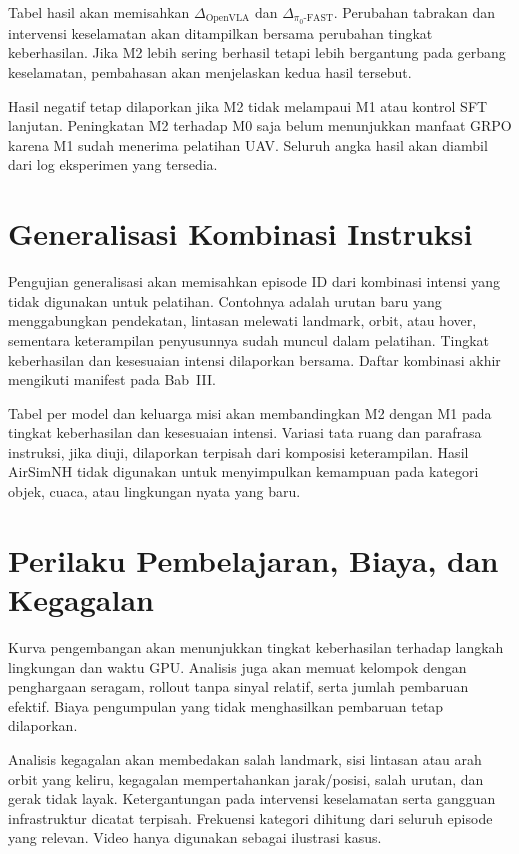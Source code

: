 Tabel hasil akan memisahkan $\Delta_{\mathrm{OpenVLA}}$ dan $\Delta_{\pi_0\text{-FAST}}$. Perubahan tabrakan dan intervensi keselamatan akan ditampilkan bersama perubahan tingkat keberhasilan. Jika M2 lebih sering berhasil tetapi lebih bergantung pada gerbang keselamatan, pembahasan akan menjelaskan kedua hasil tersebut.

Hasil negatif tetap dilaporkan jika M2 tidak melampaui M1 atau kontrol SFT lanjutan. Peningkatan M2 terhadap M0 saja belum menunjukkan manfaat GRPO karena M1 sudah menerima pelatihan UAV. Seluruh angka hasil akan diambil dari log eksperimen yang tersedia.

\section{Generalisasi Kombinasi Instruksi}
\label{sec:hasil_generalisasi}
Pengujian generalisasi akan memisahkan episode ID dari kombinasi intensi yang tidak digunakan untuk pelatihan. Contohnya adalah urutan baru yang menggabungkan pendekatan, lintasan melewati landmark, orbit, atau hover, sementara keterampilan penyusunnya sudah muncul dalam pelatihan. Tingkat keberhasilan dan kesesuaian intensi dilaporkan bersama. Daftar kombinasi akhir mengikuti manifest pada Bab~III.

Tabel per model dan keluarga misi akan membandingkan M2 dengan M1 pada tingkat keberhasilan dan kesesuaian intensi. Variasi tata ruang dan parafrasa instruksi, jika diuji, dilaporkan terpisah dari komposisi keterampilan. Hasil AirSimNH tidak digunakan untuk menyimpulkan kemampuan pada kategori objek, cuaca, atau lingkungan nyata yang baru.

\section{Perilaku Pembelajaran, Biaya, dan Kegagalan}
\label{sec:analisis_pembelajaran}
Kurva pengembangan akan menunjukkan tingkat keberhasilan terhadap langkah lingkungan dan waktu GPU. Analisis juga akan memuat kelompok dengan penghargaan seragam, rollout tanpa sinyal relatif, serta jumlah pembaruan efektif. Biaya pengumpulan yang tidak menghasilkan pembaruan tetap dilaporkan.

Analisis kegagalan akan membedakan salah landmark, sisi lintasan atau arah orbit yang keliru, kegagalan mempertahankan jarak/posisi, salah urutan, dan gerak tidak layak. Ketergantungan pada intervensi keselamatan serta gangguan infrastruktur dicatat terpisah. Frekuensi kategori dihitung dari seluruh episode yang relevan. Video hanya digunakan sebagai ilustrasi kasus.

